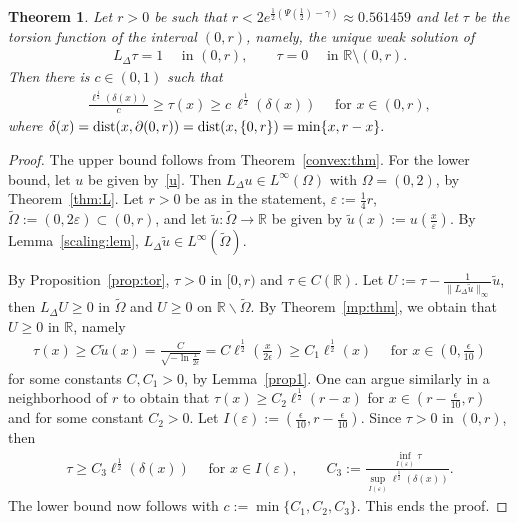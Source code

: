 \documentclass[11pt]{article}
\newcommand{\eps}{{\varepsilon}}
\newcommand{\R}{\mathbb{R}}
\numberwithin{equation}{section}
\newtheorem{theorem}{Theorem}[section]
\DeclareMathOperator{\dist}{\rm dist}
\begin{document}
\begin{theorem} \label{torsion:1D}
Let $r>0$ be such that $r<2e^{\frac{1}{2}(\Psi(\frac{1}{2})-\gamma)}\approx 0.561459$ and let $\tau$ be the torsion function of the interval $(0,r)$, namely, the unique weak solution of 
\begin{align*}
    L_\Delta \tau = 1\quad \text{ in }(0,r),\qquad \tau=0\quad \text{ in }\R\setminus (0,r).
\end{align*}
    Then there is $c\in(0,1)$ such that
    \begin{align*}
\frac{\ell^{\frac{1}{2}}(\delta(x))}{c}\geq \tau(x)\geq c\,\ell^{\frac{1}{2}}(\delta(x))\quad \text{ for }x\in (0,r),
\end{align*}
where $\delta(x)=\dist(x,\partial (0,r))=\dist(x,\{0,r\})=\min\{x,r-x\}.$
\end{theorem}
\begin{proof}
The upper bound follows from Theorem~\ref{convex:thm}.  For the lower bound, let $u$ be given by~\eqref{u}.  Then $L_\Delta u\in L^\infty(\Omega)$ with $\Omega=(0,2)$, by Theorem~\ref{thm:L}. Let $r>0$ be as in the statement, $\eps:=\frac{1}{4}r$, $\widetilde \Omega:=(0,2\eps)\subset (0,r)$, and let $\widetilde u:\widetilde \Omega\to \R$ be given by $\widetilde u(x):=u(\frac{x}{\eps})$.  By Lemma~\ref{scaling:lem}, $L_\Delta \widetilde u\in L^\infty(\widetilde \Omega)$.

By Proposition~\ref{prop:tor}, $\tau>0$ in $[0,r)$ and $\tau\in C(\R)$.  Let $U:=\tau-\frac{1}{\|L_\Delta \widetilde u\|_\infty}\widetilde u$, then $L_\Delta U \geq 0$ in $\widetilde \Omega$ and $U\geq 0$ on $\R\backslash \widetilde \Omega$. By Theorem~\ref{mp:thm}, we obtain that $U\geq 0$ in $\R$, namely
\begin{align*}
    \tau(x)\geq C \widetilde u(x)=\frac{C}{\sqrt{-\ln \frac{x}{2\epsilon}}}=C\ell^\frac{1}{2}\left(\frac{x}{2\epsilon}\right)\geq C_1\ell^{\frac{1}{2}}(x)\quad \text{ for }x\in (0,\tfrac{\epsilon}{10})
\end{align*}
for some constants $C,C_1>0$, by Lemma~\ref{prop1}. One can argue similarly in a neighborhood of $r$ to obtain that $\tau(x)\geq C_2\ell^{\frac{1}{2}}(r-x)$  for $x\in (r-\tfrac{\epsilon}{10},r)$ and for some constant $C_2>0$. Let $I(\eps):=(\tfrac{\epsilon}{10},r-\tfrac{\epsilon}{10})$. Since $\tau>0$ in $(0,r)$, then
\begin{align*}
\tau\geq C_3\ell^\frac{1}{2}(\delta(x))\quad \text{ for }x\in I(\eps),\qquad C_3:=\frac{\inf_{I(\eps)} \tau}{\sup_{I(\eps)}\ell^\frac{1}{2}(\delta(x))}.
\end{align*}
The lower bound now follows with $c:=\min\{C_1,C_2,C_3\}$. This ends the proof.
\end{proof}
\end{document}
